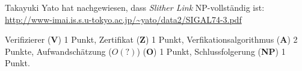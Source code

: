 \begin{diskussion}
Takayuki Yato hat nachgewiesen, dass {\em Slither Link}
NP-vollständig ist:
\url{http://www-imai.is.s.u-tokyo.ac.jp/~yato/data2/SIGAL74-3.pdf}
\end{diskussion}

\begin{bewertung}
Verifizierer (\textbf{V}) 1 Punkt,
Zertifikat (\textbf{Z}) 1 Punkt,
Verfikationsalgorithmus (\textbf{A}) 2 Punkte,
Aufwandschätzung ($O(?)$) (\textbf{O}) 1 Punkt,
Schlussfolgerung (\textbf{NP}) 1 Punkt.
\end{bewertung}
